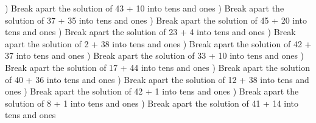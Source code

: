 \documentclass{article}%
\begin{document}
) Break apart the solution of 43 + 10 into tens and ones%
\newline%
\newline%
) Break apart the solution of 37 + 35 into tens and ones%
\newline%
\newline%
) Break apart the solution of 45 + 20 into tens and ones%
\newline%
\newline%
) Break apart the solution of 23 + 4 into tens and ones%
\newline%
\newline%
) Break apart the solution of 2 + 38 into tens and ones%
\newline%
\newline%
) Break apart the solution of 42 + 37 into tens and ones%
\newline%
\newline%
) Break apart the solution of 33 + 10 into tens and ones%
\newline%
\newline%
) Break apart the solution of 17 + 44 into tens and ones%
\newline%
\newline%
) Break apart the solution of 40 + 36 into tens and ones%
\newline%
\newline%
) Break apart the solution of 12 + 38 into tens and ones%
\newline%
\newline%
) Break apart the solution of 42 + 1 into tens and ones%
\newline%
\newline%
) Break apart the solution of 8 + 1 into tens and ones%
\newline%
\newline%
) Break apart the solution of 41 + 14 into tens and ones%
\end{document}
